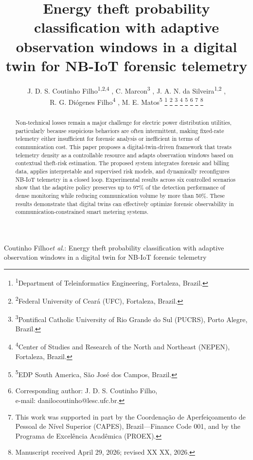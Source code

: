 \documentclass[journal]{IEEEtran}
\providecommand{\authorrefmark}[1]{\textsuperscript{#1}}
\begin{document}
\title{Energy theft probability classification with adaptive observation windows in a digital twin for NB-IoT forensic telemetry}

\author{
J. D. S. Coutinho Filho\authorrefmark{1,2,4} ,
C. Marcon\authorrefmark{3} , J. A. N. da Silveira\authorrefmark{1,2} ,
\\
R. G. Diógenes Filho\authorrefmark{4} ,
M. E. Matos\authorrefmark{5} 
%
\thanks{\authorrefmark{1}Department of Teleinformatics Engineering, Fortaleza, Brazil.}
\thanks{\authorrefmark{2}Federal University of Ceará (UFC), Fortaleza, Brazil.}
\thanks{\authorrefmark{3}Pontifical Catholic University of Rio Grande do Sul (PUCRS), Porto Alegre, Brazil.}
\thanks{\authorrefmark{4}Center of Studies and Research of the North and Northeast (NEPEN), Fortaleza, Brazil.}
\thanks{\authorrefmark{5}EDP South America, São José dos Campos, Brazil.}
\thanks{Corresponding author: J. D. S. Coutinho Filho, \\e-mail:            danilocoutinho@lesc.ufc.br.}
\thanks{This work was supported in part by the Coordenação de Aperfeiçoamento de Pessoal de Nível Superior (CAPES), Brazil---Finance Code 001, and by the Programa de Excelência Acadêmica (PROEX).}
\thanks{Manuscript received April 29, 2026; revised XX XX, 2026.}
}


%
{Coutinho Filho\MakeLowercase{\textit{et al.}}: Energy theft probability classification with adaptive observation windows in a digital twin for NB-IoT forensic telemetry}


\maketitle

\begin{abstract}
Non-technical losses remain a major challenge for electric power distribution utilities, particularly because suspicious behaviors are often intermittent, making fixed-rate telemetry either insufficient for forensic analysis or inefficient in terms of communication cost. This paper proposes a digital-twin-driven framework that treats telemetry density as a controllable resource and adapts observation windows based on contextual theft-risk estimation. The proposed system integrates forensic and billing data, applies interpretable and supervised risk models, and dynamically reconfigures NB-IoT telemetry in a closed loop. Experimental results across six controlled scenarios show that the adaptive policy preserves up to 97\% of the detection performance of dense monitoring while reducing communication volume by more than 50\%. These results demonstrate that digital twins can effectively optimize forensic observability in communication-constrained smart metering systems. 
\end{abstract}
\end{document}
